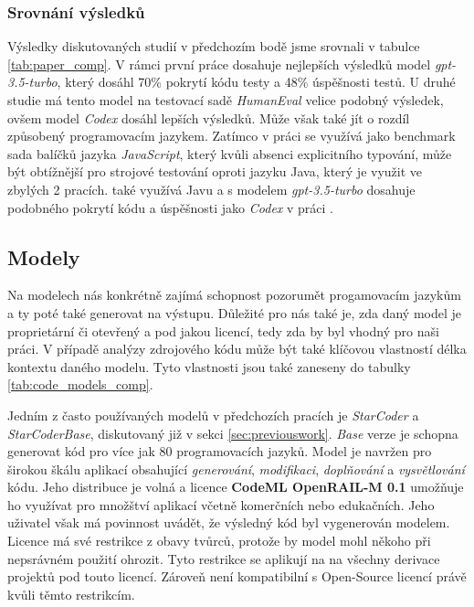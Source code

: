 \documentclass[czech, ma, kiv, he, iso690alph, pdf, viewonly]{fasthesis}
\begin{document}
    \subsubsection{Srovnání výsledků}
    Výsledky diskutovaných studií v předchozím bodě jsme srovnali v tabulce \ref{tab:paper_comp}. V rámci první práce dosahuje nejlepších výsledků model \textit{gpt-3.5-turbo}, který dosáhl 70\% pokrytí kódu testy a 48\% úspěšnosti testů. U druhé studie má tento model na testovací sadě \textit{HumanEval} velice podobný výsledek, ovšem model \textit{Codex} dosáhl lepších výsledků. Může však také jít o rozdíl způsobený programovacím jazykem. Zatímco v práci \cite{schafer2023empirical} se využívá jako benchmark sada balíčků jazyka \textit{JavaScript}, který kvůli absenci explicitního typování, může být obtížnější pro strojové testování oproti jazyku Java, který je využit ve zbylých 2 pracích. \cite{jutai} také využívá Javu a s modelem \textit{gpt-3.5-turbo} dosahuje podobného pokrytí kódu a úspěšnosti jako \textit{Codex} v práci \cite{siddiq2023exploring}.


    \subsection{Modely}
    Na  modelech nás konkrétně zajímá schopnost pozorumět progamovacím jazykům a ty poté také generovat na výstupu. Důležité pro nás také je, zda daný model je proprietární či otevřený a pod jakou licencí, tedy zda by byl vhodný pro naši práci. V případě analýzy zdrojového kódu může být také klíčovou vlastností délka kontextu daného modelu. Tyto vlastnosti jsou také zaneseny do tabulky \ref{tab:code_models_comp}.

    Jedním z často používaných modelů v předchozích pracích je \textit{StarCoder} a \textit{StarCoderBase}, diskutovaný již v sekci \ref{sec:previouswork}. \textit{Base} verze je schopna generovat kód pro více jak 80 programovacích jazyků. Model je navržen pro širokou škálu aplikací obsahující \textit{generování}, \textit{modifikaci}, \textit{doplňování} a \textit{vysvětlování} kódu. Jeho distribuce je volná a licence \textbf{CodeML OpenRAIL-M 0.1} \cite{BigCode2023} umožňuje ho využívat pro množštví aplikací včetně komerčních nebo edukačních. Jeho uživatel však má povinnost uvádět, že výsledný kód byl vygenerován modelem. Licence má své restrikce z obavy tvůrců, protože by model mohl někoho při nepsrávném použití ohrozit. Tyto restrikce se aplikují na na všechny derivace projektů pod touto licencí. Zároveň není kompatibilní s Open-Source licencí právě kvůli těmto restrikcím.
\end{document}
